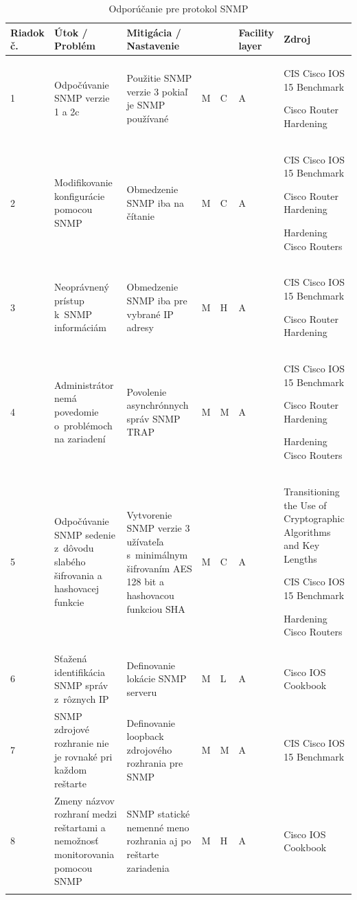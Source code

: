 \begin{longtable}[!htbp]{|C{2.5em}L{9em}L{9em}C{2em}C{2.5em}C{7.5em}L{10em}|}
	
	\hline
	\centering
	
	Riadok č.	&Útok / Problém	&Mitigácia / Nastavenie	& 	&	&Facility layer	&Zdroj\\
	\endhead
	
	 1	&Odpočúvanie SNMP verzie 1 a 2c	&Použitie SNMP verzie 3 pokiaľ je SNMP používané	&M	&C	&A	&CIS Cisco IOS 15 Benchmark \cite{CIS_DrTLsgXv24lxeIIM}
	
	Cisco Router Hardening \cite{Graesser2001}\\
	2	&Modifikovanie konfigurácie pomocou SNMP	&Obmedzenie SNMP iba na čítanie	&M	&C	&A	&CIS Cisco IOS 15 Benchmark \cite{CIS_DrTLsgXv24lxeIIM}
	
	Cisco Router Hardening \cite{Graesser2001}
	
	Hardening Cisco Routers \cite{Akin2002}\\
	 3	&Neoprávnený prístup k~SNMP informáciám	&Obmedzenie SNMP iba pre vybrané IP adresy	&M	&H	&A	&CIS Cisco IOS 15 Benchmark \cite{CIS_DrTLsgXv24lxeIIM}
	
	Cisco Router Hardening \cite{Graesser2001}\\
	4	&Administrátor nemá povedomie o~problémoch na zariadení	&Povolenie asynchrónnych správ SNMP TRAP	&M	&M	&A	&CIS Cisco IOS 15 Benchmark \cite{CIS_DrTLsgXv24lxeIIM}
	
	Cisco Router Hardening \cite{Graesser2001}
	
	Hardening Cisco Routers \cite{Akin2002}\\
	 5	&Odpočúvanie SNMP sedenie z~dôvodu slabého šifrovania a hashovacej  funkcie	&Vytvorenie SNMP verzie 3 užívateľa s~minimálnym šifrovaním AES 128 bit a hashovacou funkciou SHA	&M	&C	&A	&Transitioning the Use of Cryptographic Algorithms and Key Lengths \cite{Barker2019}
	
	CIS Cisco IOS 15 Benchmark \cite{CIS_DrTLsgXv24lxeIIM}
	
	Hardening Cisco Routers \cite{Akin2002}\\
	6	&Sťažená identifikácia SNMP správ z~rôznych IP	&Definovanie lokácie SNMP serveru	&M	&L	&A	&Cisco IOS Cookbook \cite{Dooley2007}\\
	 7	&SNMP zdrojové rozhranie nie je rovnaké pri každom reštarte	& Definovanie loopback zdrojového rozhrania pre SNMP	&M	&M	&A	&CIS Cisco IOS 15 Benchmark \cite{CIS_DrTLsgXv24lxeIIM}\\
	8	&Zmeny názvov rozhraní medzi reštartami a nemožnosť monitorovania pomocou SNMP	&SNMP statické nemenné meno rozhrania aj po reštarte zariadenia	&M	&H	&A	&Cisco IOS Cookbook \cite{Dooley2007}\\
	
	\hline
	\caption{Odporúčanie pre protokol SNMP}
	\label{tab:snmp}%
\end{longtable}%

